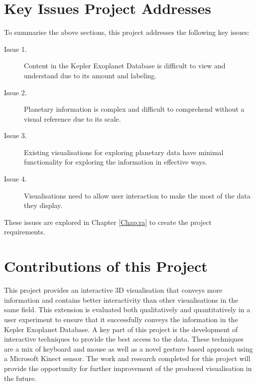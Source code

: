 \section{Key Issues Project Addresses}
To summarise the above sections, this project addresses the following key
issues:
\begin{description}
 \item[Issue 1.] Content in the Kepler Exoplanet Database is difficult to view
and
understand due to its amount and labeling.
 \item[Issue 2.] Planetary information is complex and difficult to comprehend
without
a visual reference due to its scale.
 \item[Issue 3.] Existing visualisations for exploring planetary data have
minimal
functionality for exploring the information in effective ways.
 \item[Issue 4.] Visualisations need to allow user interaction to make the most
of
the data they display.
\end{description}
These issues are explored in Chapter \ref{Chap:ra} to create
the project requirements.

\section{Contributions of this Project}
This project provides an interactive 3D visualisation that conveys more
information and
contains better interactivity than other visualisations in the same field. This
extension is evaluated both qualitatively and quantitatively in a user experiment to ensure that it
successfully conveys the information in the Kepler Exoplanet Database.
A key part of this project is the development of interactive techniques to
provide the best access to the data. These techniques are a mix of keyboard and
mouse as well as a novel gesture based approach using a Microsoft Kinect sensor.
The work and research completed for this project will provide the opportunity
for further improvement of the produced visualisation in the future.
